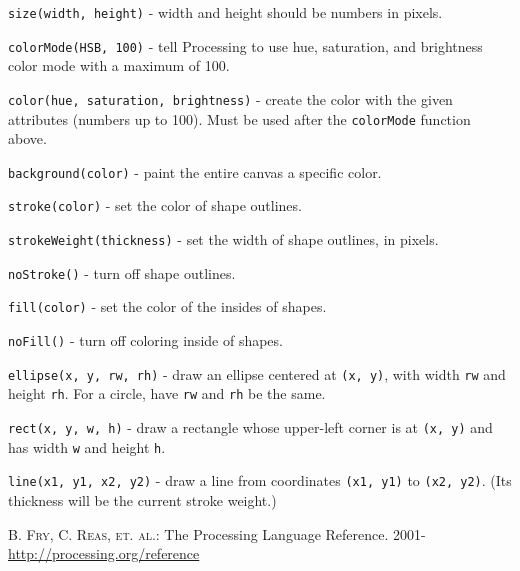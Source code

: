 \documentclass[
]{leaflet}
\begin{document}
\texttt{size(width, height)} - width and height should be numbers in pixels.

\texttt{colorMode(HSB, 100)} - tell Processing to use hue, saturation, and brightness color mode with a maximum of 100.

\texttt{color(hue, saturation, brightness)} - create the color with the given attributes (numbers up to 100).
Must be used after the \texttt{colorMode} function above.

\texttt{background(color)} - paint the entire canvas a specific color.

\texttt{stroke(color)} - set the color of shape outlines.

\texttt{strokeWeight(thickness)} - set the width of shape outlines, in pixels.

\texttt{noStroke()} - turn off shape outlines.

\texttt{fill(color)} - set the color of the insides of shapes.

\texttt{noFill()} - turn off coloring inside of shapes.

\texttt{ellipse(x, y, rw, rh)} - draw an ellipse centered at \texttt{(x, y)}, with width \texttt{rw} and height \texttt{rh}.
For a circle, have \texttt{rw} and \texttt{rh} be the same.

\texttt{rect(x, y, w, h)} - draw a rectangle whose upper-left corner is at \texttt{(x, y)} and has width \texttt{w} and height \texttt{h}.

\texttt{line(x1, y1, x2, y2)} - draw a line from coordinates \texttt{(x1, y1)} to \texttt{(x2, y2)}.
(Its thickness will be the current stroke weight.)


\begin{thebibliography}{000}
  \textsc{B. Fry, C. Reas, et. al.}: The Processing Language Reference. 2001-\\
  \url{http://processing.org/reference}
\end{thebibliography}

\loggingall
\end{document}
